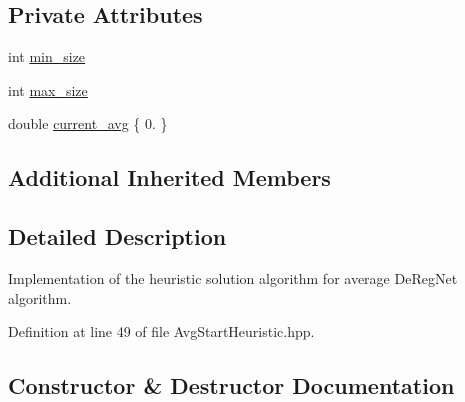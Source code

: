 \subsection*{Private Attributes}
\begin{DoxyCompactItemize}
\item 
int \hyperlink{classderegnet_1_1AvgStartHeuristic_a3abc4d801d4eb1fdb8ecfed7077045b3}{min\+\_\+size}
\item 
int \hyperlink{classderegnet_1_1AvgStartHeuristic_a4794e58ea33d94f9029defa3a31cc573}{max\+\_\+size}
\item 
double \hyperlink{classderegnet_1_1AvgStartHeuristic_a2c4b3fa6aa7946276404e650ea42fd14}{current\+\_\+avg} \{ 0. \}
\end{DoxyCompactItemize}
\subsection*{Additional Inherited Members}


\subsection{Detailed Description}
Implementation of the heuristic solution algorithm for average De\+Reg\+Net algorithm. 

Definition at line 49 of file Avg\+Start\+Heuristic.\+hpp.



\subsection{Constructor \& Destructor Documentation}
\mbox{\label{classderegnet_1_1AvgStartHeuristic_afcbb54f71a6277598a40d6c06ebddbf0}} 
